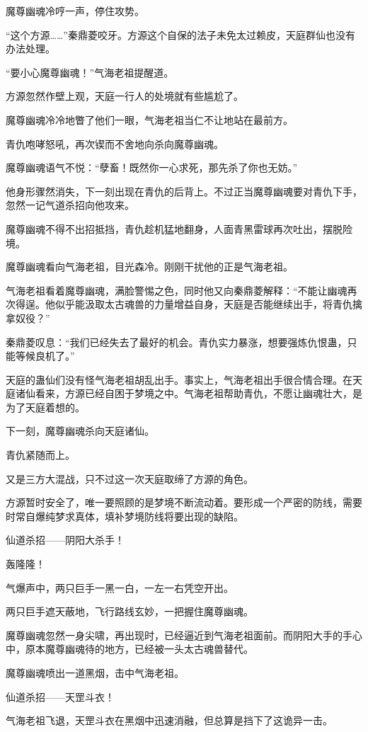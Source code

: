 \begin{this_body}
魔尊幽魂冷哼一声，停住攻势。

“这个方源……”秦鼎菱咬牙。方源这个自保的法子未免太过赖皮，天庭群仙也没有办法处理。

“要小心魔尊幽魂！”气海老祖提醒道。

方源忽然作壁上观，天庭一行人的处境就有些尴尬了。

魔尊幽魂冷冷地瞥了他们一眼，气海老祖当仁不让地站在最前方。

青仇咆哮怒吼，再次锲而不舍地向杀向魔尊幽魂。

魔尊幽魂语气不悦：“孽畜！既然你一心求死，那先杀了你也无妨。”

他身形骤然消失，下一刻出现在青仇的后背上。不过正当魔尊幽魂要对青仇下手，忽然一记气道杀招向他攻来。

魔尊幽魂不得不出招抵挡，青仇趁机猛地翻身，人面青黑雷球再次吐出，摆脱险境。

魔尊幽魂看向气海老祖，目光森冷。刚刚干扰他的正是气海老祖。

气海老祖看着魔尊幽魂，满脸警惕之色，同时他又向秦鼎菱解释：“不能让幽魂再次得逞。他似乎能汲取太古魂兽的力量增益自身，天庭是否能继续出手，将青仇擒拿奴役？”

秦鼎菱叹息：“我们已经失去了最好的机会。青仇实力暴涨，想要强炼仇恨蛊，只能等候良机了。”

天庭的蛊仙们没有怪气海老祖胡乱出手。事实上，气海老祖出手很合情合理。在天庭诸仙看来，方源已经自困于梦境之中。气海老祖帮助青仇，不愿让幽魂壮大，是为了天庭着想的。

下一刻，魔尊幽魂杀向天庭诸仙。

青仇紧随而上。

又是三方大混战，只不过这一次天庭取缔了方源的角色。

方源暂时安全了，唯一要照顾的是梦境不断流动着。要形成一个严密的防线，需要时常自爆纯梦求真体，填补梦境防线将要出现的缺陷。

仙道杀招——阴阳大杀手！

轰隆隆！

气爆声中，两只巨手一黑一白，一左一右凭空开出。

两只巨手遮天蔽地，飞行路线玄妙，一把握住魔尊幽魂。

魔尊幽魂忽然一身尖啸，再出现时，已经逼近到气海老祖面前。而阴阳大手的手心中，原本魔尊幽魂待的地方，已经被一头太古魂兽替代。

魔尊幽魂喷出一道黑烟，击中气海老祖。

仙道杀招——天罡斗衣！

气海老祖飞退，天罡斗衣在黑烟中迅速消融，但总算是挡下了这诡异一击。


\end{this_body}
